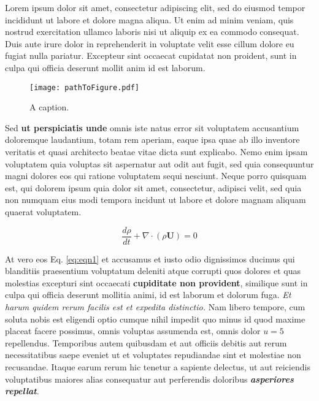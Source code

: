 Lorem ipsum dolor sit amet, consectetur adipiscing elit, sed do eiusmod tempor incididunt ut labore et dolore magna aliqua. Ut enim ad minim veniam, quis nostrud exercitation ullamco laboris nisi ut aliquip ex ea commodo consequat. Duis aute irure dolor in reprehenderit in voluptate velit esse cillum dolore eu fugiat nulla pariatur. Excepteur sint occaecat cupidatat non proident, sunt in culpa qui officia deserunt mollit anim id est laborum.

\begin{figure}
\texttt{[image: pathToFigure.pdf]}
\caption{A caption.}
\end{figure}

Sed \textbf{ut perspiciatis unde} omnis iste natus error sit voluptatem accusantium doloremque laudantium, totam rem aperiam, eaque ipsa quae ab illo inventore veritatis et quasi architecto beatae vitae dicta sunt explicabo. Nemo enim ipsam voluptatem quia voluptas sit aspernatur aut odit aut fugit, sed quia consequuntur magni dolores eos qui ratione voluptatem sequi nesciunt. Neque porro quisquam est, qui dolorem ipsum quia dolor sit amet, consectetur, adipisci velit, sed quia non numquam eius modi tempora incidunt ut labore et dolore magnam aliquam quaerat voluptatem. 

\begin{equation}
\frac{d\rho}{dt} 
+ \nabla \cdot \left( \rho \mathbf{U} \right) = 0 
\label{eq:eqn1}
\end{equation}

At vero eos Eq. \eqref{eq:eqn1} et accusamus et iusto odio dignissimos ducimus qui blanditiis praesentium voluptatum deleniti atque corrupti quos dolores et quas molestias excepturi sint occaecati \textbf{cupiditate non provident}, similique sunt in culpa qui officia deserunt mollitia animi, id est laborum et dolorum fuga. \textit{Et harum quidem rerum facilis est et expedita distinctio.} Nam libero tempore, cum soluta nobis est eligendi optio cumque nihil impedit quo minus id quod maxime placeat facere possimus, omnis voluptas assumenda est, omnis dolor $u = 5$ repellendus. Temporibus autem quibusdam et aut officiis debitis aut rerum necessitatibus saepe eveniet ut et voluptates repudiandae sint et molestiae non recusandae. Itaque earum rerum hic tenetur a sapiente delectus, ut aut reiciendis voluptatibus maiores alias consequatur aut perferendis doloribus \textit{\textbf{asperiores repellat}}.

